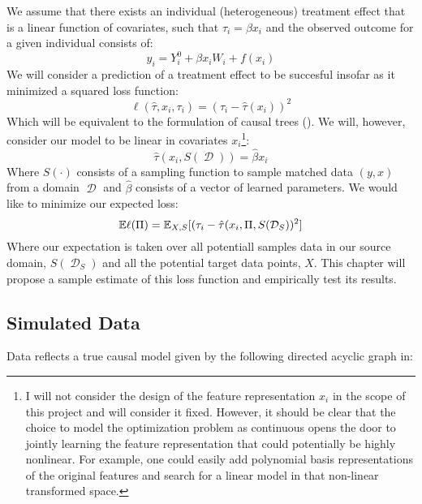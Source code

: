 \documentclass[a4paper,12pt]{article}
\DeclareMathOperator*{\D}{\mathcal{D}}
\begin{document}
We assume that there exists an individual (heterogeneous) treatment effect that is a linear function of covariates, such that $\tau_i = \beta x_i$ and the observed outcome for a given individual consists of:
%
$$
y_i = Y^0_i + \beta x_iW_i + f(x_i)
$$
%
We will consider a prediction of a treatment effect to be succesful insofar as it minimized a squared loss function:
%
$$
\ell(\hat{\tau}, x_i, \tau_i) = (\tau_i - \hat{\tau}(x_i))^2
$$
%
Which will be equivalent to the formulation of causal trees (\cite{Athey2016}). We will, however, consider our model to be linear in covariates $x_i$\footnote{I will not consider the design of the feature representation $x_i$ in the scope of this project and will consider it fixed. However, it should be clear that the choice to model the optimization problem as continuous opens the door to jointly learning the feature representation that could potentially be highly nonlinear. For example, one could easily add polynomial basis representations of the original features and search for a linear model in that non-linear transformed space.}:
%
$$
\hat{\tau}(x_i, S(\D)) = \hat{\beta} x_i
$$
%
Where $S(\cdot)$ consists of a sampling function to sample matched data $(y, x)$ from a domain $\D$ and $\hat{\beta}$ consists of a vector of learned parameters. We would like to minimize our expected loss:
%
$$
\mathbb{E} \ell(\Pi) = \mathbb{E}_{X, S} [ (\tau_i - \hat{\tau}(x_i, \Pi, S(\mathcal{D}_S))^2  ]
$$
%
Where our expectation is taken over all potentiall samples data in our source domain, $S(\D_S)$ and all the potential target data points, $X$. This chapter will propose a sample estimate of this loss function and empirically test its results.

\subsection{ Simulated Data }

Data reflects a true causal model given by the following directed acyclic graph in:

\vspace{5mm}
\vspace{5mm}
\end{document}
